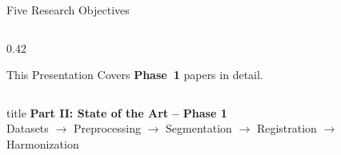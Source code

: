\documentclass[aspectratio=169,xcolor=dvipsnames]{beamer}
\begin{document}
\begin{frame}{Five Research Objectives}
\begin{columns}
\begin{column}{0.42\textwidth}
            \vspace{0.3em}

            \begin{alertblock}{\small This Presentation}
                \small Covers \textbf{Phase~1} papers in detail.
            \end{alertblock}
        \end{column}
    \end{columns}
\end{frame}

\begin{frame}[plain]
    \centering
    \vfill
    \begin{beamercolorbox}[center,shadow=true,rounded=true]{title}
        \textbf{Part II: State of the Art -- Phase 1}\\
        \vspace{0.5em}
        \large Datasets $\to$ Preprocessing $\to$ Segmentation $\to$ Registration $\to$ Harmonization
    \end{beamercolorbox}
    \vfill
\end{frame}
\end{document}
